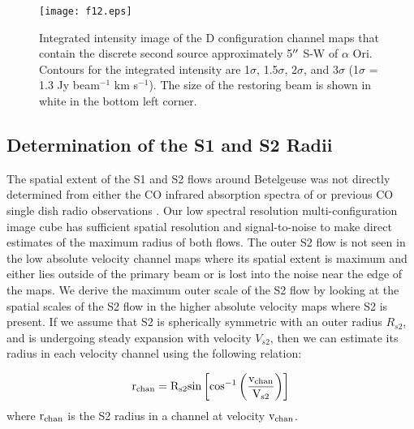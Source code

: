 \documentclass[iop]{emulateapj}
\begin{document}
\begin{figure}
\texttt{[image: f12.eps]}
\caption{Integrated intensity image of the D configuration channel maps that contain the discrete second source approximately 5$\mbox{$^{\prime\prime}$}$ S-W of $\alpha$ Ori. Contours for the integrated intensity are 1$\sigma$, 1.5$\sigma$, 2$\sigma$, and 3$\sigma$ (1$\sigma$ = 1.3 Jy beam${}^{-1}$ km s${}^{-1}$). The size of the restoring beam is shown in white in the bottom left corner.}
\label{fig:fig4}
\end{figure}

\subsection{Determination of the S1 and S2 Radii} \label{results3} 
The spatial extent of the S1 and S2 flows around Betelgeuse was not directly determined from either the CO infrared absorption spectra of \cite{1979ApJ...233L.135B} or previous CO single dish radio observations \citep{1980ApJ...242L..25K, 1987ApJ...313..400H, 1994ApJ...424L.127H}. Our low spectral resolution multi-configuration image cube has sufficient spatial resolution and signal-to-noise to make direct estimates of the maximum radius of both flows. The outer S2 flow is not seen in the low absolute velocity channel maps where its spatial extent is maximum and either lies outside of the primary beam or is lost into the noise near the edge of the maps. We derive the maximum outer scale of the S2 flow by looking at the spatial scales of the S2 flow in the higher absolute velocity maps where S2 is present. If we assume that S2 is spherically symmetric with an outer radius $R_{s2}$, and is undergoing steady expansion with velocity $V_{s2}$, then we can estimate its radius in each velocity channel using the following relation:

\begin{equation}
\rm{r_{chan}}=R_{s2} \rm{sin}\left[\rm{cos}^{-1}\left(\frac{v_{chan}}{V_{s2}}\right) \right]
\end{equation} 
where $\rm{r_{chan}}$ is the S2 radius in a channel at velocity $\rm{v_{chan}}$. 
\end{document}

